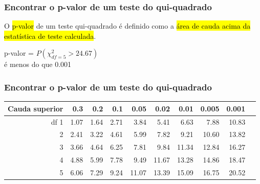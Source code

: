 
\begin{frame}
\frametitle{Encontrar o p-valor de um teste do qui-quadrado}
\justifying
O \hl{p-valor} de um teste qui-quadrado é definido como a \hl{área de cauda acima da estatística de teste calculada}.

{
p-valor = $P(\chi^2_{df = 5} > 24.67)$\\ é menos do que 0.001
}
\end{frame}

\begin{frame}
\frametitle{Encontrar o p-valor de um teste do qui-quadrado}

\begin{center}
{
\begin{tabular}{r | rrrr | rrrr r}
  \hline
Cauda superior & 0.3 & 0.2 & 0.1 & 0.05 & 0.02 & 0.01 & 0.005 & 0.001 & \orange{$\rightarrow$}  \\ 
  \hline
df \hfill 1 &  1.07 &  1.64 &  2.71 &  3.84 &  5.41 &  6.63 &  7.88 &  10.83 \\ 
  2 &  2.41 &  3.22 &  4.61 &  5.99 &  7.82 &  9.21 &  10.60 &  13.82 \\ 
  3 &  3.66 &  4.64 &  6.25 &  7.81 &  9.84 &  11.34 &  12.84 &  16.27 \\ 
  4 &  4.88 &  5.99 &  7.78 &  9.49 &  11.67 &  13.28 &  14.86 &  18.47 \\ 
  \rowcolor[gray]{.6}
  5 &  6.06 &  7.29 &  9.24 &  11.07 &  13.39 &  15.09 &  16.75 &  20.52 &\orange{$\rightarrow$} \\ 
  \hline
\end{tabular}
}
\end{center}

\end{frame}

